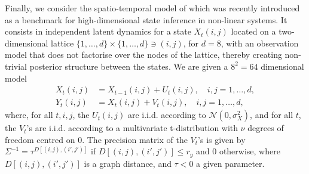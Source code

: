 Finally, we consider the spatio-temporal model of \citet[Section 4.2]{cruscino2022highdim} which was recently introduced as a benchmark for high-dimensional state inference in non-linear systems. It consists in independent latent dynamics for a state $X_t(i, j)$ located on a two-dimensional lattice $\{1, \ldots, d\} \times \{1, \ldots, d\} \ni (i,j)$, for $d=8$, with an observation model that does not factorise over the nodes of the lattice, thereby creating non-trivial posterior structure between the states. We are given a $8^2 = 64$ dimensional model
\begin{equation}
    \label{eq:spatio-temporal}
    \begin{split}
        X_t(i, j) &= X_{t-1}(i, j) + U_t(i, j), \quad i, j = 1, \ldots, d, \\
        Y_t(i, j) &= X_{t}(i, j) + V_t(i, j), \quad i, j = 1, \ldots, d,
    \end{split}
\end{equation}
where, for all $t, i, j$, the $U_t(i, j)$ are i.i.d. according to $\mathcal{N}(0, \sigma_X^2)$, and for all $t$, the $V_t$'s are i.i.d. according to a multivariate t-distribution with $\nu$ degrees of freedom centred on $0$. The precision matrix of the $V_t$'s is given by $\Sigma^{-1} = \tau^{D[(i, j), (i', j')]}$ if $D[(i, j), (i', j')] \leq r_y$ and $0$ otherwise, where $D[(i, j), (i', j')]$ is a graph distance, and $\tau < 0$ a given parameter.


